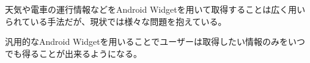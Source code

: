 


\begin{jabstract}
天気や電車の運行情報などをAndroid Widgetを用いて取得することは広く用いられている手法だが、現状では様々な問題を抱えている。

汎用的なAndroid Widgetを用いることでユーザーは取得したい情報のみをいつでも得ることが出来るようになる。

\end{jabstract}



